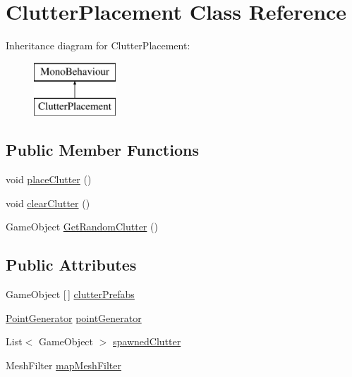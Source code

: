 \hypertarget{class_clutter_placement}{}\section{Clutter\+Placement Class Reference}
\label{class_clutter_placement}
Inheritance diagram for Clutter\+Placement\+:\begin{figure}[H]
\begin{center}
\leavevmode
\includegraphics[height=2.000000cm]{class_clutter_placement}
\end{center}
\end{figure}
\subsection*{Public Member Functions}
\begin{DoxyCompactItemize}
\item 
void \mbox{\hyperlink{class_clutter_placement_ab27c08059209c83e0978398f3bfdde9b}{place\+Clutter}} ()
\item 
void \mbox{\hyperlink{class_clutter_placement_a04a7692842800b021ea68e6be3ed5a4c}{clear\+Clutter}} ()
\item 
Game\+Object \mbox{\hyperlink{class_clutter_placement_a00508e28f3977a7622a11653cb625f65}{Get\+Random\+Clutter}} ()
\end{DoxyCompactItemize}
\subsection*{Public Attributes}
\begin{DoxyCompactItemize}
\item 
Game\+Object \mbox{[}$\,$\mbox{]} \mbox{\hyperlink{class_clutter_placement_a0438378166fab8abdbb483d4252e181f}{clutter\+Prefabs}}
\item 
\mbox{\hyperlink{class_point_generator}{Point\+Generator}} \mbox{\hyperlink{class_clutter_placement_a954b2af9e4dcc7ffe61b63c9f1b7a873}{point\+Generator}}
\item 
List$<$ Game\+Object $>$ \mbox{\hyperlink{class_clutter_placement_ad9f568266937efd7a7938371c7179e4a}{spawned\+Clutter}}
\item 
Mesh\+Filter \mbox{\hyperlink{class_clutter_placement_a28d25417ea666507f5a68e5c789ac903}{map\+Mesh\+Filter}}
\end{DoxyCompactItemize}


